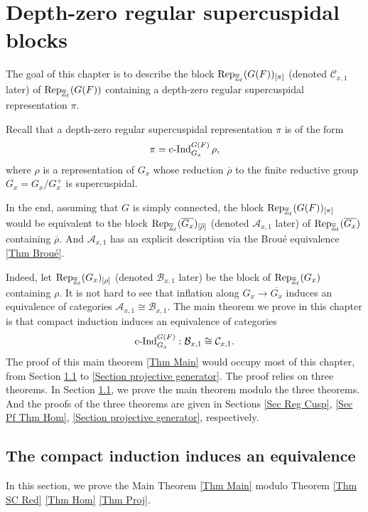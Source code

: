 
		
		\chapter{Depth-zero regular supercuspidal blocks} \label{Chapter Rep}
		
		The goal of this chapter is to describe the block $\operatorname{\operatorname{Rep}}_{\overline{\mathbb{Z}}_{\ell}}(G(F))_{[\pi]}$ (denoted $\mathcal{C}_{x,1}$ later) of $\operatorname{\operatorname{Rep}}_{\overline{\mathbb{Z}}_{\ell}}(G(F))$ containing a  depth-zero regular supercuspidal representation $\pi$.
		
		Recall that a depth-zero regular supercuspidal representation $\pi$ is of the form
		$$\pi=\operatorname{\operatorname{c-Ind}}_{G_x}^{G(F)}\rho,$$
		where $\rho$ is a representation of $G_x$ whose reduction $\overline{\rho}$ to the finite reductive group
		$\overline{G_x}=G_x/G_x^+$ is supercuspidal.
		
		In the end, assuming that $G$ is simply connected, the block $\operatorname{\operatorname{Rep}}_{\overline{\mathbb{Z}}_{\ell}}(G(F))_{[\pi]}$ would be equivalent to the block $\operatorname{\operatorname{Rep}}_{\overline{\mathbb{Z}}_{\ell}}(\overline{G_x})_{[\overline{\rho}]}$ (denoted $\mathcal{A}_{x,1}$ later) of $\operatorname{\operatorname{Rep}}_{\overline{\mathbb{Z}}_{\ell}}(\overline{G_x})$ containing $\overline{\rho}$. And $\mathcal{A}_{x,1}$ has an explicit description via the Broué equivalence \ref{Thm Broué}.
		
		Indeed, let $\operatorname{\operatorname{Rep}}_{\overline{\mathbb{Z}}_{\ell}}(G_x)_{[\rho]}$ (denoted $\mathcal{B}_{x,1}$ later) be the block of $\operatorname{\operatorname{Rep}}_{\overline{\mathbb{Z}}_{\ell}}(G_x)$ containing $\rho$. It is not hard to see that inflation along $G_x \to \overline{G_x}$ induces an equivalence of categories 
		$\mathcal{A}_{x,1} \cong \mathcal{B}_{x,1}$. The main theorem we prove in this chapter is that compact induction induces an equivalence of categories
		$$\operatorname{\operatorname{c-Ind}}_{G_x}^{G(F)}: \mathcal{B}_{x,1} \cong \mathcal{C}_{x,1}.$$
		The proof of this main theorem \ref{Thm Main} would occupy most of this chapter, from Section \ref{Section cInd} to \ref{Section projective generator}. The proof relies on three theorems. In Section \ref{Section cInd}, we prove the main theorem modulo the three theorems. And the proofs of the three theorems are given in Sections \ref{Sec Reg Cusp}, \ref{Sec Pf Thm Hom}, \ref{Section projective generator}, respectively.
		
		
		\section{The compact induction induces an equivalence}\label{Section cInd}
		In this section, we prove the Main Theorem \ref{Thm Main} modulo Theorem \ref{Thm SC Red} \ref{Thm Hom} \ref{Thm Proj}.
		
